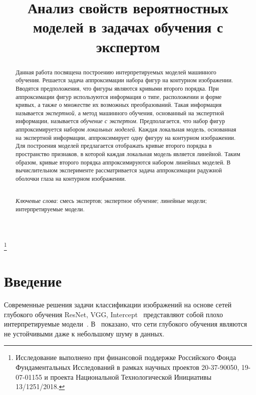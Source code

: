\documentclass[12pt]{a&t}
\begin{document}

\title{Анализ свойств вероятностных моделей в задачах обучения с экспертом}%
\thanks{Исследование выполнено при финансовой поддержке Российского Фонда Фундаментальных Исследований в рамках научных проектов 20-37-90050, 19-07-01155 и проекта Национальной Технологической Инициативы 13/1251/2018.}



\maketitle

\begin{abstract}
Данная работа посвящена построению интерпретируемых моделей машинного обучения.
Решается задача аппроксимации набора фигур на контурном изображении.
Вводятся предположения, что фигуры являются кривыми второго порядка.
При аппроксимации фигур используются информация о типе, расположении и форме кривых, а также о множестве их возможных преобразований.
Такая информация называется \textit{экспертной}, а метод машинного обучения, основанный на экспертной информации, называется \textit{обучение с экспертом}.
Предполагается, что набор фигур аппроксимируется набором \textit{локальных моделей}.
Каждая локальная модель, основанная на экспертной информации, аппроксимирует одну фигуру на контурном изображении.
Для построения моделей предлагается отображать кривые второго порядка в пространство признаков, в которой каждая локальная модель является линейной.
Таким образом, кривые второго порядка аппроксимируются набором линейных моделей.
В вычислительном эксперименте рассматривается задача аппроксимации радужной оболочки глаза на контурном изображении.

\smallskip\\
\textit{Ключевые слова}: смесь экспертов; экспертное обучение; линейные модели; интерпретируемые модели.
\end{abstract}

\section{Введение}
Современные решения задачи классификации изображений на основе сетей глубокого обучения ResNet, VGG, Intercept~\cite{Kaiming2015} представляют собой плохо интерпретируемые модели~\cite{Ribeiro2016}.
В~\cite{Han2020, Akhtar2018} показано, что сети глубокого обучения являются не устойчивыми даже к небольшому шуму в данных.
\end{document}
